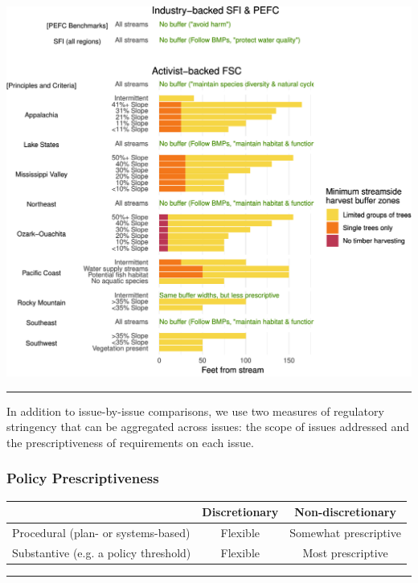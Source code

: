 \documentclass[
      12pt,
        ]{article}
\begin{document}
\begin{center}\includegraphics{Figs/riparian-1} \end{center}

\begin{center}\rule{0.5\linewidth}{\linethickness}\end{center}

In addition to issue-by-issue comparisons, we use two measures of
regulatory stringency that can be aggregated across issues: the scope of
issues addressed and the prescriptiveness of requirements on each issue.

\subsubsection{Policy Prescriptiveness}\label{policy-prescriptiveness}

\begin{longtable}[]{@{}lcc@{}}
\toprule
& Discretionary & Non-discretionary\tabularnewline
\midrule
\endhead
Procedural (plan- or systems-based) & Flexible & Somewhat
prescriptive\tabularnewline
Substantive (e.g. a policy threshold) & Flexible & Most
prescriptive\tabularnewline
\bottomrule
\end{longtable}

\begin{center}\rule{0.5\linewidth}{\linethickness}\end{center}
\end{document}
